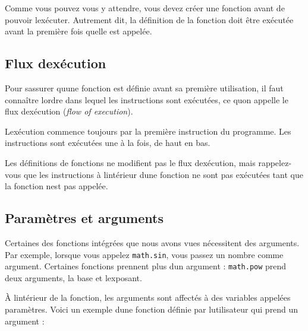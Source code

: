 Comme vous pouvez vous y attendre, vous devez créer une fonction avant
de pouvoir l\textquotesingle exécuter. Autrement dit, la définition de
la fonction doit être exécutée avant la première fois
qu\textquotesingle elle est appelée.

\hypertarget{flux-dexuxe9cution}{%
\subsection{Flux d\textquotesingle exécution}\label{flux-dexuxe9cution}}

Pour s\textquotesingle assurer qu\textquotesingle une fonction est
définie avant sa première utilisation, il faut connaître
l\textquotesingle ordre dans lequel les instructions sont exécutées, ce
qu\textquotesingle on appelle le flux d\textquotesingle exécution
(\emph{flow of execution}).

L\textquotesingle exécution commence toujours par la première
instruction du programme. Les instructions sont exécutées une à la fois,
de haut en bas.

Les définitions de fonctions ne modifient pas le flux
d\textquotesingle exécution, mais rappelez-vous que les instructions à
l\textquotesingle intérieur d\textquotesingle une fonction ne sont pas
exécutées tant que la fonction n\textquotesingle est pas appelée.

\hypertarget{paramuxe8tres-et-arguments}{%
\subsection{Paramètres et arguments}\label{paramuxe8tres-et-arguments}}

Certaines des fonctions intégrées que nous avons vues nécessitent des
arguments. Par exemple, lorsque vous appelez \texttt{math.sin}, vous
passez un nombre comme argument. Certaines fonctions prennent plus
d\textquotesingle un argument : \texttt{math.pow} prend deux arguments,
la base et l\textquotesingle exposant.

À l\textquotesingle intérieur de la fonction, les arguments sont
affectés à des variables appelées paramètres. Voici un exemple
d\textquotesingle une fonction définie par l\textquotesingle utilisateur
qui prend un argument :

\begin{Shaded}
\begin{Highlighting}[]
\end{Highlighting}
\end{Shaded}

